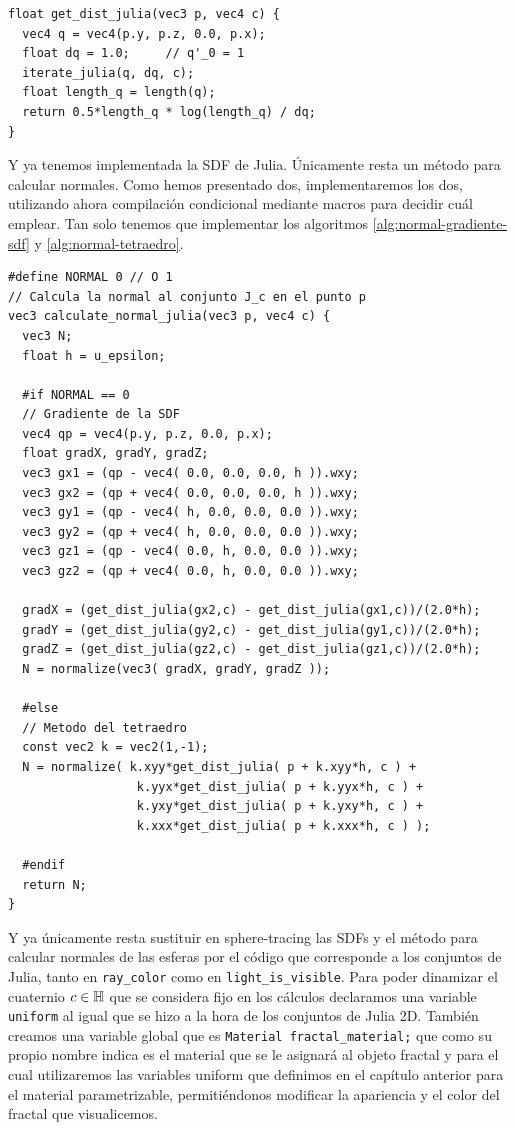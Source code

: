 \begin{lstlisting}
float get_dist_julia(vec3 p, vec4 c) { 
  vec4 q = vec4(p.y, p.z, 0.0, p.x);
  float dq = 1.0;     // q'_0 = 1
  iterate_julia(q, dq, c);
  float length_q = length(q);
  return 0.5*length_q * log(length_q) / dq;
}
\end{lstlisting}

Y ya tenemos implementada la SDF de Julia. Únicamente resta un método para calcular normales. Como hemos presentado dos, implementaremos los dos, utilizando ahora compilación condicional mediante macros para decidir cuál emplear. Tan solo tenemos que implementar los algoritmos \ref{alg:normal-gradiente-sdf} y \ref{alg:normal-tetraedro}. %

\begin{lstlisting}
#define NORMAL 0 // O 1
// Calcula la normal al conjunto J_c en el punto p
vec3 calculate_normal_julia(vec3 p, vec4 c) {
  vec3 N;
  float h = u_epsilon;

  #if NORMAL == 0
  // Gradiente de la SDF
  vec4 qp = vec4(p.y, p.z, 0.0, p.x);
  float gradX, gradY, gradZ;
  vec3 gx1 = (qp - vec4( 0.0, 0.0, 0.0, h )).wxy;
  vec3 gx2 = (qp + vec4( 0.0, 0.0, 0.0, h )).wxy;
  vec3 gy1 = (qp - vec4( h, 0.0, 0.0, 0.0 )).wxy;
  vec3 gy2 = (qp + vec4( h, 0.0, 0.0, 0.0 )).wxy;
  vec3 gz1 = (qp - vec4( 0.0, h, 0.0, 0.0 )).wxy;
  vec3 gz2 = (qp + vec4( 0.0, h, 0.0, 0.0 )).wxy;
  
  gradX = (get_dist_julia(gx2,c) - get_dist_julia(gx1,c))/(2.0*h);
  gradY = (get_dist_julia(gy2,c) - get_dist_julia(gy1,c))/(2.0*h);
  gradZ = (get_dist_julia(gz2,c) - get_dist_julia(gz1,c))/(2.0*h);
  N = normalize(vec3( gradX, gradY, gradZ ));

  #else
  // Metodo del tetraedro
  const vec2 k = vec2(1,-1);
  N = normalize( k.xyy*get_dist_julia( p + k.xyy*h, c ) + 
                  k.yyx*get_dist_julia( p + k.yyx*h, c ) + 
                  k.yxy*get_dist_julia( p + k.yxy*h, c ) + 
                  k.xxx*get_dist_julia( p + k.xxx*h, c ) );

  #endif
  return N;
}
\end{lstlisting}

Y ya únicamente resta sustituir en sphere-tracing las SDFs y el método para calcular normales de las esferas por el código que corresponde a los conjuntos de Julia, tanto en \verb|ray_color| como en \verb|light_is_visible|. Para poder dinamizar el cuaternio $c\in\mathbb{H}$ que se considera fijo en los cálculos declaramos una variable \verb|uniform| al igual que se hizo a la hora de los conjuntos de Julia 2D. También creamos una variable global que es \verb|Material fractal_material;| que como su propio nombre indica es el material que se le asignará al objeto fractal y para el cual utilizaremos las variables uniform que definimos en el capítulo anterior para el material parametrizable, permitiéndonos modificar la apariencia y el color del fractal que visualicemos.

